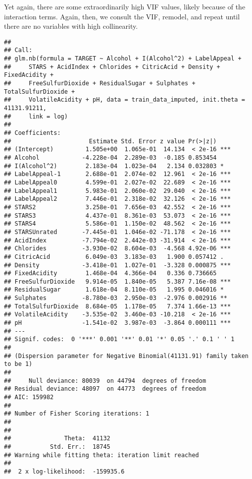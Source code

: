 \documentclass[
]{article}
\begin{document}
Yet again, there are some extraordinarily high VIF values, likely
because of the interaction terms. Again, then, we consult the VIF,
remodel, and repeat until there are no variables with high collinearity.

\begin{verbatim}
## 
## Call:
## glm.nb(formula = TARGET ~ Alcohol + I(Alcohol^2) + LabelAppeal + 
##     STARS + AcidIndex + Chlorides + CitricAcid + Density + FixedAcidity + 
##     FreeSulfurDioxide + ResidualSugar + Sulphates + TotalSulfurDioxide + 
##     VolatileAcidity + pH, data = train_data_imputed, init.theta = 41131.91211, 
##     link = log)
## 
## Coefficients:
##                      Estimate Std. Error z value Pr(>|z|)    
## (Intercept)         1.505e+00  1.065e-01  14.134  < 2e-16 ***
## Alcohol            -4.228e-04  2.289e-03  -0.185 0.853454    
## I(Alcohol^2)        2.183e-04  1.023e-04   2.134 0.032803 *  
## LabelAppeal-1       2.688e-01  2.074e-02  12.961  < 2e-16 ***
## LabelAppeal0        4.599e-01  2.027e-02  22.689  < 2e-16 ***
## LabelAppeal1        5.983e-01  2.060e-02  29.040  < 2e-16 ***
## LabelAppeal2        7.446e-01  2.318e-02  32.126  < 2e-16 ***
## STARS2              3.258e-01  7.656e-03  42.552  < 2e-16 ***
## STARS3              4.437e-01  8.361e-03  53.073  < 2e-16 ***
## STARS4              5.586e-01  1.150e-02  48.562  < 2e-16 ***
## STARSUnrated       -7.445e-01  1.046e-02 -71.178  < 2e-16 ***
## AcidIndex          -7.794e-02  2.442e-03 -31.914  < 2e-16 ***
## Chlorides          -3.930e-02  8.604e-03  -4.568 4.92e-06 ***
## CitricAcid          6.049e-03  3.183e-03   1.900 0.057412 .  
## Density            -3.418e-01  1.027e-01  -3.328 0.000875 ***
## FixedAcidity        1.468e-04  4.366e-04   0.336 0.736665    
## FreeSulfurDioxide   9.914e-05  1.840e-05   5.387 7.16e-08 ***
## ResidualSugar       1.618e-04  8.110e-05   1.995 0.046016 *  
## Sulphates          -8.780e-03  2.950e-03  -2.976 0.002916 ** 
## TotalSulfurDioxide  8.684e-05  1.178e-05   7.374 1.66e-13 ***
## VolatileAcidity    -3.535e-02  3.460e-03 -10.218  < 2e-16 ***
## pH                 -1.541e-02  3.987e-03  -3.864 0.000111 ***
## ---
## Signif. codes:  0 '***' 0.001 '**' 0.01 '*' 0.05 '.' 0.1 ' ' 1
## 
## (Dispersion parameter for Negative Binomial(41131.91) family taken to be 1)
## 
##     Null deviance: 80039  on 44794  degrees of freedom
## Residual deviance: 48097  on 44773  degrees of freedom
## AIC: 159982
## 
## Number of Fisher Scoring iterations: 1
## 
## 
##               Theta:  41132 
##           Std. Err.:  18745 
## Warning while fitting theta: iteration limit reached 
## 
##  2 x log-likelihood:  -159935.6
\end{verbatim}
\end{document}
